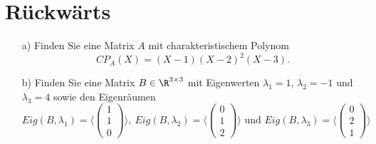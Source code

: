 \newpage

\section{Rückwärts}
\begin{itemize}
\item[a)] Finden Sie eine Matrix $A$ mit charakteristischem Polynom 
$$CP_A(X)=(X-1)(X-2)^2(X-3).$$
\item[b)] Finden Sie eine Matrix $B \in \R^{3\times 3}$ mit Eigenwerten $\lambda_1= 1$, $\lambda_2=-1$ und $\lambda_3=4$ sowie den Eigenräumen
$$
Eig(B,\lambda_1)=\langle \begin{pmatrix} 1 \\ 1 \\ 0 \end{pmatrix} \rangle, \ Eig(B,\lambda_2)=\langle \begin{pmatrix} 0 \\ 1 \\ 2 \end{pmatrix} \rangle \text{ und } Eig(B,\lambda_3)=\langle \begin{pmatrix} 0 \\ 2 \\ 1 \end{pmatrix} \rangle
$$
\end{itemize}


